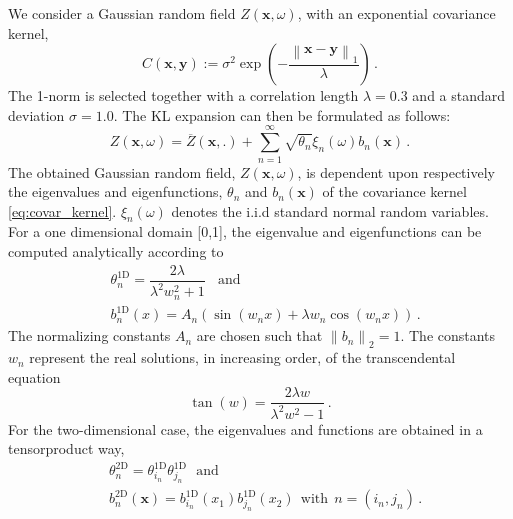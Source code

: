\documentclass{ICASP13Paper}
\newcommand\norm[1]{\left\lVert#1\right\rVert}
\begin{document}
We consider a Gaussian random field $Z\left(\mathbf{x},\omega\right)$, with an exponential covariance kernel,
\begin{equation}
C\left(\mathbf{x},\mathbf{y}\right):=\sigma^2 \exp\left(-\frac{\norm{\mathbf{x}-\mathbf{y}}_1}{\lambda}\right)\,.
\label{eq:covar_kernel}
\end{equation}
The 1-norm is selected together with a correlation length $\lambda = 0.3$ and a standard deviation $\sigma = 1.0$. The KL expansion can then be formulated as follows:
\begin{equation}
Z(\mathbf{x},\omega)=\overline{Z}(\mathbf{x},.)+\sum_{n=1}^{\infty}  \sqrt{\theta_n} \xi_n(\omega) b_n(\mathbf{x})\,.
\end{equation}
The obtained Gaussian random field, $Z(\mathbf{x},\omega)$, is dependent upon respectively the eigenvalues and eigenfunctions, $\theta_n$ and $b_n\left(\mathbf{x}\right)$ of the covariance kernel \eqref{eq:covar_kernel}. $\xi_n\left(\omega\right)$ denotes the i.i.d standard normal random variables. For a one dimensional domain [0,1], the eigenvalue and eigenfunctions can be computed analytically according to 
\begin{equation}
\begin{split}
\label{eq:1D_eigVec}%
 &\theta_n^{1\text{D}}= \dfrac{2 \lambda}{\lambda^2 w_n^2 +1}
 ~~~~\mbox{and}~~~ \\
&b^{1\text{D}}_n(x) = A_n \left(\sin(w_n x) +\lambda w_n \cos(w_n x)\right)\,.
\end{split}
\end{equation}
The normalizing constants $A_n$ are chosen such that $ \norm{b_n}_2 = 1$.
The constants $w_n$ represent the real solutions, in increasing order, of the transcendental equation
\begin{equation}\label{eq:transcendental}
\tan(w)=\dfrac{2 \lambda w}{\lambda^2 w^2 -1}\,.
\end{equation}
For the two-dimensional case, the eigenvalues and functions are obtained in a tensorproduct way,
\begin{equation}
\begin{split}
\label{eq:2d_eigenVal}%
&\theta_n^{2\text{D}} = \theta_{i_{n}}^{1\text{D}} \theta_{j_n}^{1\text{D}}
~~~\mbox{and}~~ \\
& b_n^{2\text{D}} (\mathbf{x}) = b_{i_n}^{1\text{D}} (x_1) b_{j_n}^{1\text{D}} (x_2)~~ \mbox{with}~~n = (i_n, j_n)\,.
 \end{split}
\end{equation}
\end{document}
